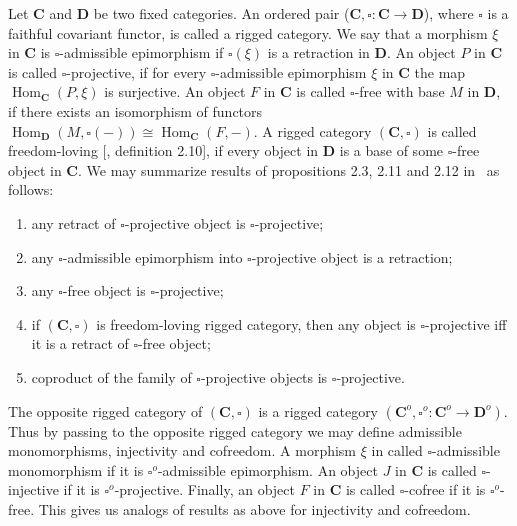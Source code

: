 Let $\mathbf{C}$ and $\mathbf{D}$ be two fixed categories. An ordered pair
($\mathbf{C}, \square:\mathbf{C}\to\mathbf{D}$), where $\square$ is a faithful
covariant functor, is called a rigged category. We say that a morphism $\xi$ in
$\mathbf{C}$ is $\square$-admissible epimorphism if $\square (\xi)$ is a
retraction in $\mathbf{D}$. An object $P$ in $\mathbf{C}$ is called
$\square$-projective, if for every $\square$-admissible epimorphism $\xi$ in
$\mathbf{C}$ the map $\operatorname{Hom}_{\mathbf{C}}(P,\xi)$ is surjective. An
object $F$ in $\mathbf{C}$ is called $\square$-free with base $M$ in
$\mathbf{D}$, if there exists an isomorphism of functors
$\operatorname{Hom}_{\mathbf{D}}(M,\square(-))
\cong
\operatorname{Hom}_{\mathbf{C}}(F,-)$.
A rigged category $(\mathbf{C},\square)$ is called  freedom-loving
[\cite{HelMetrFrQMod}, definition 2.10], if every object in $\mathbf{D}$ is a
base of some $\square$-free object in $\mathbf{C}$. We may summarize results of
propositions 2.3, 2.11  and 2.12 in~\cite{HelMetrFrQMod} as follows:
\begin{enumerate}[label = (\roman*)]
  \item any retract of $\square$-projective object is $\square$-projective;

  \item any $\square$-admissible epimorphism into $\square$-projective object 
  is a retraction;

  \item any $\square$-free object is $\square$-projective;

  \item if $(\mathbf{C},\square)$ is freedom-loving rigged category, then any
  object is $\square$-projective iff it is a retract of $\square$-free object;

  \item coproduct of the family of $\square$-projective objects is
  $\square$-projective.
\end{enumerate}

The opposite rigged category of $(\mathbf{C}, \square)$ is a rigged category
$(\mathbf{C}^{o},\square^{o}:\mathbf{C}^{o}\to\mathbf{D}^{o})$. Thus by passing
to the opposite rigged category we may define admissible monomorphisms,
injectivity and cofreedom. A morphism $\xi$ in called $\square$-admissible
monomorphism if it is $\square^o$-admissible epimorphism. An object $J$ in
$\mathbf{C}$ is called $\square$-injective if it is $\square^o$-projective.
Finally, an object $F$ in $\mathbf{C}$ is called $\square$-cofree if it is
$\square^o$-free. This gives us analogs of results as above for injectivity and
cofreedom.

